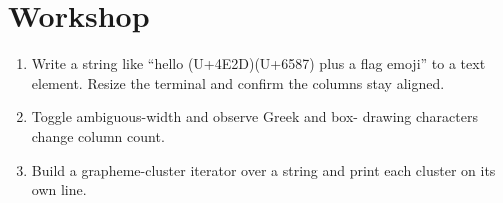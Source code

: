 \section*{Workshop}

\begin{enumerate}[leftmargin=*]
  \item Write a string like ``hello (U+4E2D)(U+6587) plus a flag emoji''
    to a text element. Resize the terminal and confirm the
    columns stay aligned.
  \item Toggle ambiguous-width and observe Greek and box-
    drawing characters change column count.
  \item Build a grapheme-cluster iterator over a string and
    print each cluster on its own line.
\end{enumerate}
